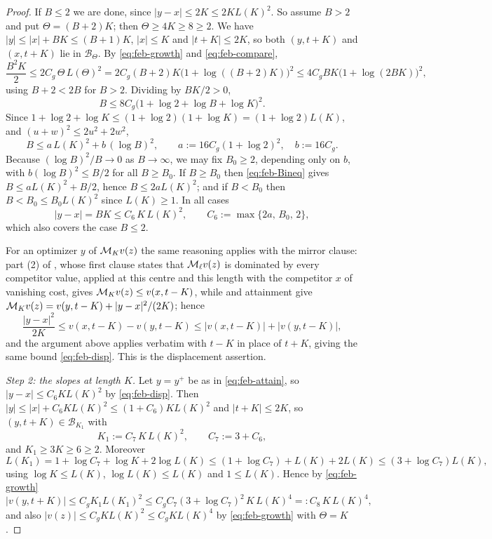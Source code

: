 \begin{proof}
If $B\le2$ we are done, since $|y-x|\le2K\le2KL(K)^2$. So assume $B>2$ and put
$\Theta=(B+2)K$; then $\Theta\ge4K\ge8\ge2$. We have $|y|\le|x|+BK\le(B+1)K$,
$|x|\le K$ and $|t+K|\le2K$, so both $(y,t+K)$ and $(x,t+K)$ lie in
$\mathcal B_\Theta$. By \eqref{eq:feb-growth} and \eqref{eq:feb-compare},
\[
  \frac{B^2K}{2}\le2C_g\,\Theta\,L(\Theta)^2
   =2C_g(B+2)K\bigl(1+\log((B+2)K)\bigr)^2
   \le4C_gBK\bigl(1+\log(2BK)\bigr)^2 ,
\]
using $B+2<2B$ for $B>2$. Dividing by $BK/2>0$,
\[
  B\le8C_g\bigl(1+\log2+\log B+\log K\bigr)^2 .
\]
Since $1+\log2+\log K\le(1+\log2)(1+\log K)=(1+\log2)L(K)$, and
$(u+w)^2\le2u^2+2w^2$,
\begin{equation}\label{eq:feb-Bineq}
  B\le a\,L(K)^2+b\,(\log B)^2,
  \qquad a:=16C_g(1+\log2)^2,\quad b:=16C_g .
\end{equation}
Because $(\log B)^2/B\to0$ as $B\to\infty$, we may fix $B_0\ge2$, depending only
on $b$, with $b(\log B)^2\le B/2$ for all $B\ge B_0$. If $B\ge B_0$ then
\eqref{eq:feb-Bineq} gives $B\le aL(K)^2+B/2$, hence $B\le2aL(K)^2$; and if
$B<B_0$ then $B<B_0\le B_0L(K)^2$ since $L(K)\ge1$. In all cases
\begin{equation}\label{eq:feb-disp}
  |y-x|=BK\le C_6\,K\,L(K)^2,\qquad C_6:=\max\{2a,\,B_0,\,2\} ,
\end{equation}
which also covers the case $B\le2$.

For an optimizer $y$ of $\mathcal{M}_Kv(z)$ the same reasoning applies with the mirror
clause: part (2) of , whose first clause states
that $\mathcal{M}_\ell v(z)$ is dominated by every competitor value, applied at this
centre and this length with the competitor $x$ of vanishing cost, gives
$\mathcal{M}_Kv(z)\le v(x,t-K)$, while  and attainment give
$\mathcal{M}_Kv(z)=v(y,t-K)+|y-x|^2/(2K)$; hence
\[
  \frac{|y-x|^2}{2K}\le v(x,t-K)-v(y,t-K)\le|v(x,t-K)|+|v(y,t-K)| ,
\]
and the argument above applies verbatim with $t-K$ in place of $t+K$, giving the
same bound \eqref{eq:feb-disp}. This is the displacement assertion.

\emph{Step 2: the slopes at length $K$.}
Let $y=y^+$ be as in \eqref{eq:feb-attain}, so $|y-x|\le C_6KL(K)^2$ by
\eqref{eq:feb-disp}. Then
$|y|\le|x|+C_6KL(K)^2\le(1+C_6)KL(K)^2$ and $|t+K|\le2K$, so
$(y,t+K)\in\mathcal B_{K_1}$ with
\[
  K_1:=C_7\,K\,L(K)^2,\qquad C_7:=3+C_6 ,
\]
and $K_1\ge3K\ge6\ge2$. Moreover
\[
  L(K_1)=1+\log C_7+\log K+2\log L(K)
   \le(1+\log C_7)+L(K)+2L(K)\le(3+\log C_7)L(K),
\]
using $\log K\le L(K)$, $\log L(K)\le L(K)$ and $1\le L(K)$. Hence by
\eqref{eq:feb-growth}
\begin{equation}\label{eq:feb-vbig}
  |v(y,t+K)|\le C_gK_1L(K_1)^2
   \le C_gC_7(3+\log C_7)^2\,K\,L(K)^4=:C_8\,K\,L(K)^4 ,
\end{equation}
and also $|v(z)|\le C_gKL(K)^2\le C_gKL(K)^4$ by \eqref{eq:feb-growth} with
$\Theta=K$.


\end{proof}

